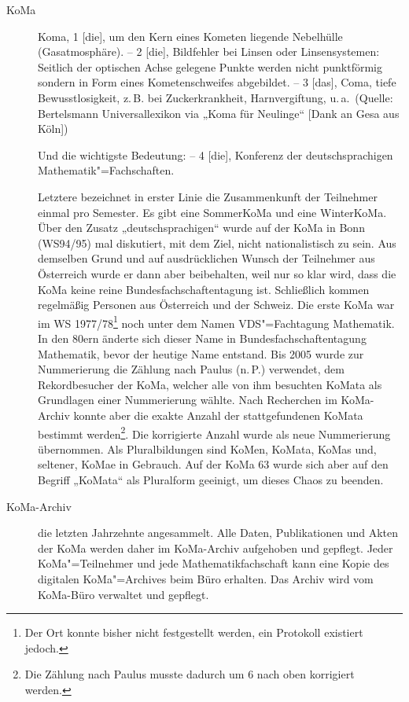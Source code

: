 \begin{description}
\item[KoMa] Koma, 1 [die], um den Kern eines Kometen liegende Nebelhülle
	(Gasatmosphäre). – 2 [die], Bildfehler bei Linsen oder Linsensystemen:
	Seitlich der optischen Achse gelegene Punkte werden nicht punktförmig
	sondern in Form eines Kometenschweifes abgebildet. – 3 [das], Coma, tiefe
	Bewusstlosigkeit, z.\,B. bei Zuckerkrankheit, Harnvergiftung, u.\,a.\
	(Quelle: Bertelsmann Universallexikon via „Koma für Neulinge“ [Dank an Gesa
	aus Köln])

	Und die wichtigste Bedeutung: – 4 [die], Konferenz der deutschsprachigen
	Mathematik"=Fachschaften.

	Letztere bezeichnet in erster Linie die Zusammenkunft der Teilnehmer einmal
	pro Semester. Es gibt eine SommerKoMa und eine WinterKoMa. Über den Zusatz
	„deutschsprachigen“ wurde auf der KoMa in Bonn (WS94/95) mal diskutiert,
	mit dem Ziel, nicht nationalistisch zu sein. Aus demselben Grund und auf
	ausdrücklichen Wunsch der Teilnehmer aus Österreich wurde er dann aber
	beibehalten, weil nur so klar wird, dass die KoMa keine reine
	Bundesfachschaftentagung ist. Schließlich kommen regelmäßig Personen aus
	Österreich und der Schweiz. Die erste KoMa war im WS 1977/78\footnote{Der
	Ort konnte bisher nicht festgestellt werden, ein Protokoll existiert
	jedoch.} noch unter dem Namen VDS"=Fachtagung Mathematik. In den 80ern
	änderte sich dieser Name in Bundesfachschaftentagung Mathematik, bevor der
	heutige Name entstand.  Bis 2005 wurde zur Nummerierung die Zählung nach
	Paulus (n.\,P.) verwendet, dem Rekordbesucher der KoMa, welcher alle von
	ihm besuchten KoMata als Grundlagen einer Nummerierung wählte. Nach
	Recherchen im KoMa-Archiv konnte aber die exakte Anzahl der stattgefundenen
	KoMata bestimmt werden\footnote{Die Zählung nach Paulus musste dadurch um 6
	nach oben korrigiert werden.}. Die korrigierte Anzahl wurde als neue
	Nummerierung übernommen.  Als Pluralbildungen sind KoMen, KoMata, KoMas
	und, seltener, KoMae in Gebrauch. Auf der KoMa 63 wurde sich aber auf den
	Begriff „KoMata“ als Pluralform geeinigt, um dieses Chaos zu beenden.

\item[KoMa-Archiv] %
	die letzten Jahrzehnte angesammelt. Alle Daten, Publikationen und Akten der
	KoMa werden daher im KoMa-Archiv aufgehoben und gepflegt.  Jeder
	KoMa"=Teilnehmer und jede Mathematikfachschaft kann eine Kopie des digitalen
	KoMa"=Archives beim Büro erhalten. Das Archiv wird vom KoMa-Büro verwaltet
	und gepflegt.


\end{description}

